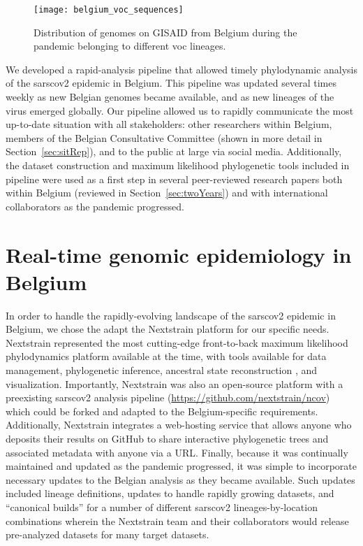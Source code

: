 \begin{figure}[ht]
  \centering
  \texttt{[image: belgium\_voc\_sequences]}
  \caption[VOC sequences in Belgium]{Distribution of genomes on GISAID from Belgium during the pandemic belonging to different \gls{voc} lineages.}
  \label{fig:beVoc}
\end{figure}

We developed a rapid-analysis pipeline that allowed timely phylodynamic analysis of the \gls{sarscov2} epidemic in Belgium.
This pipeline was updated several times weekly as new Belgian genomes became available, and as new lineages of the virus emerged globally.
Our pipeline allowed us to rapidly communicate the most up-to-date situation with all stakeholders: other researchers within Belgium, members of the Belgian Consultative Committee (shown in more detail in Section~\ref{sec:sitRep}), and to the public at large via social media.
Additionally, the dataset construction and maximum likelihood phylogenetic tools included in pipeline were used as a first step in several peer-reviewed research papers both within Belgium (reviewed in Section~\ref{sec:twoYears}) and with international collaborators \citep{dudas2021emergence,holtz2024emergence} as the pandemic progressed.

\section{Real-time genomic epidemiology in Belgium}\label{sec:nextstrainBE}
In order to handle the rapidly-evolving landscape of the \gls{sarscov2} epidemic in Belgium, we chose the adapt the Nextstrain \citep{hadfield2018nextstrain} platform for our specific needs.
Nextstrain represented the most cutting-edge front-to-back maximum likelihood phylodynamics platform available at the time, with tools available for data management, phylogenetic inference, ancestral state reconstruction \citep{huddleston2021augur}, and visualization.
Importantly, Nextstrain was also an open-source platform with a preexisting \gls{sarscov2} analysis pipeline (\url{https://github.com/nextstrain/ncov}) which could be forked and adapted to the Belgium-specific requirements.
Additionally, Nextstrain integrates a web-hosting service that allows anyone who deposits their results on GitHub to share interactive phylogenetic trees and associated metadata with anyone via a URL.
Finally, because it was continually maintained and updated as the pandemic progressed, it was simple to incorporate necessary updates to the Belgian analysis as they became available.
Such updates included lineage definitions, updates to handle rapidly growing datasets, and ``canonical builds'' for a number of different \gls{sarscov2} lineages-by-location combinations wherein the Nextstrain team and their collaborators would release pre-analyzed datasets for many target datasets.

